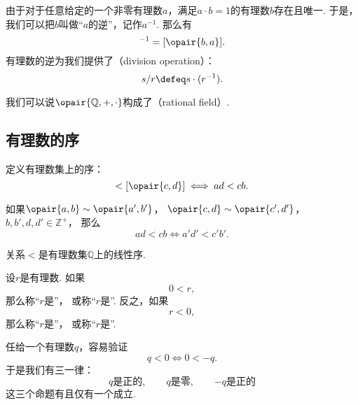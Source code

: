 由于对于任意给定的一个非零有理数\(a\)，满足\(a \cdot b = 1\)的有理数\(b\)存在且唯一.
于是，我们可以把\(b\)叫做“\(a\)的逆”，记作\(a^{-1}\).
那么有\begin{equation}
	[\opair{a,b}]^{-1}=[\opair{b,a}].
\end{equation}
有理数的逆为我们提供了（division operation）：
\begin{equation}
	s/r \defeq s \cdot (r^{-1}).
\end{equation}

我们可以说\(\opair{\mathbb{Q},+,\cdot}\)构成了（rational field）.

\subsection{有理数的序}
定义有理数集上的序：
\begin{equation}
	[\opair{a,b}]<[\opair{c,d}]
	\iff
	ad<cb.
\end{equation}

\begin{lemma}\label{theorem:集合论.有理数集上的序是良定的}
如果\(\opair{a,b}\sim\opair{a',b'}\)，
\(\opair{c,d}\sim\opair{c',d'}\)，
\(b,b',d,d'\in\mathbb{Z}^+\)，
那么\begin{equation*}
	ad<cb \iff a'd'<c'b'.
\end{equation*}
\end{lemma}

\begin{theorem}\label{theorem:集合论.有理数集上的序是线性序}
关系\(<\)是有理数集\(\mathbb{Q}\)上的线性序.
\end{theorem}

\begin{definition}
设\(r\)是有理数.
如果\begin{equation*}
	0<r,
\end{equation*}
那么称“\(r\)是”，
或称“\(r\)是”.
反之，如果\begin{equation*}
	r<0,
\end{equation*}
那么称“\(r\)是”，
或称“\(r\)是”.
\end{definition}

任给一个有理数\(q\)，容易验证\begin{equation*}
	q < 0
	\iff
	0 < -q.
\end{equation*}
于是我们有三一律：\begin{equation*}
	\text{\(q\)是正的}, \qquad
	\text{\(q\)是零}, \qquad
	\text{\(-q\)是正的}
\end{equation*}这三个命题有且仅有一个成立.

